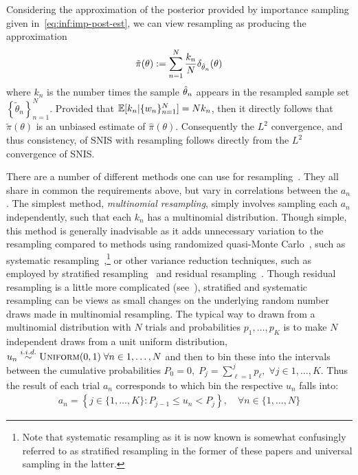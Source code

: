 Considering the approximation of the
posterior provided by importance sampling given in~\eqref{eq:inf:imp-post-est}, we can view
resampling as producing the approximation
\begin{align}
\label{eq:inf:resampling-post}
\tilde{\pi}(\theta) := \sum_{n=1}^{N} \frac{k_n}{N} \delta_{\hat{\theta}_n} (\theta)
\end{align}
where $k_n$ is the number times the sample $\hat{\theta}_n$ appears in the resampled sample
set $\left\{\tilde{\theta}_n\right\}_{n=1}^N$.  Provided that $\mathbb{E}[k_n | \{w_n\}_{n=1}^N] = Nk_n$,
then it directly follows that $\tilde{\pi}(\theta)$ is an unbiased estimate of $\hat{\pi}(\theta)$.
Consequently the $L^2$ convergence, and thus consistency, of SNIS with resampling follows
directly from the $L^2$ convergence of SNIS.
	
There are a number of different methods one can use for resampling~\citep{douc2005comparison}.  They all share in 
common the requirements above, but vary in correlations between the $a_n$.  The simplest
method, \emph{multinomial resampling}, simply involves sampling each $a_n$ independently,
such that each $k_n$ has a multinomial distribution.  Though simple, this method is generally
inadvisable as it adds unnecessary variation to the resampling compared to methods using randomized
quasi-Monte Carlo~\citep{l2005recent}, such as systematic 
resampling~\cite{carpenter1999improved,whitley1994genetic},\footnote{Note that systematic resampling as it is now known is
	somewhat confusingly referred to as stratified resampling in the former of these papers and universal
	sampling in the latter.}
or other variance reduction techniques, such as employed by stratified 
resampling~\citep{kitagawa1996monte} and residual resampling~\citep{whitley1994genetic}.
Though residual resampling is a little more complicated (see~\cite{douc2005comparison}),
stratified and systematic resampling can be views as small changes on the underlying random
number draws made in multinomial resampling.  The typical way to drawn from a multinomial
distribution with $N$ trials and probabilities $p_1,\dots,p_K$ is to make $N$ independent
draws from a unit uniform distribution, $u_n \overset{i.i.d.}{\sim} \textsc{Uniform}(0,1) \; \forall n\in1,\dots,N$
and then to bin these into the intervals between the cumulative probabilities
$P_0 = 0, \; P_{j} = \sum_{\ell=1}^{j} p_{\ell}, \; \forall j\in1,\dots,K$.  Thus 
the result of each trial $a_n$ corresponds to which bin the respective $u_n$ falls into:
\begin{align}
\label{eq:inf:multinomial}
a_n = \left\{j \in \{1,\dots,K\} \colon P_{j-1} \le u_n < P_j\right\}, \quad \forall n \in \{1,\dots,N\}
\end{align}
